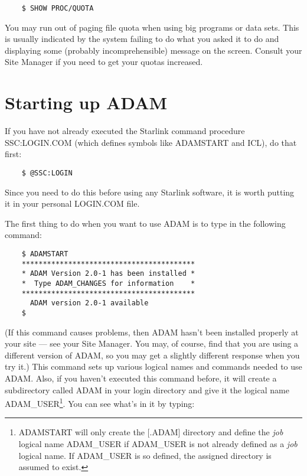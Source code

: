 \begin{small}
\begin{verbatim}
    $ SHOW PROC/QUOTA
\end{verbatim}
\end{small}

You may run out of paging file quota when using big programs or data sets.
This is usually indicated by the system failing to do what you asked it to do
and displaying some (probably incomprehensible) message on the screen.
Consult your Site Manager if you need to get your quotas increased.

\section{Starting up ADAM}
\label{S_startadam}

If you have not already executed the Starlink command procedure SSC:LOGIN.COM
(which defines symbols like ADAMSTART and ICL), do that first:

\begin{small}
\begin{verbatim}
    $ @SSC:LOGIN
\end{verbatim}
\end{small}

Since you need to do this before using any Starlink software, it is worth
putting it in your personal LOGIN.COM file.

The first thing to do when you want to use ADAM is to type in the following
command:

\begin{small}
\begin{verbatim}
    $ ADAMSTART
    *****************************************
    * ADAM Version 2.0-1 has been installed *
    *  Type ADAM_CHANGES for information    *
    *****************************************
      ADAM version 2.0-1 available
    $
\end{verbatim}
\end{small}

(If this command causes problems, then ADAM hasn't been installed properly at
your site --- see your Site Manager.
You may, of course, find that you are using a different version of ADAM, so you
may get a slightly different response when you try it.)
This command sets up various logical names and commands needed to use ADAM.
Also, if you haven't executed this command before, it will create a subdirectory
called ADAM in your login directory and give it the logical name
ADAM\_USER\footnote{
ADAMSTART will only create the [.ADAM] directory and define the {\em job}
logical name ADAM\-\_USER if ADAM\-\_USER is not already defined as a
{\em job} logical name.
If ADAM\_USER is so defined, the assigned directory is assumed to exist.}.
You can see what's in it by typing:

